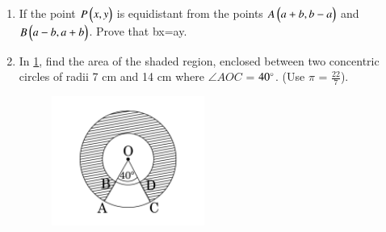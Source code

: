 \documentclass[book,11pt]{IEEEtran}
\renewcommand\thesection{\arabic{section}}
\begin{document}
\begin{enumerate}[label=\thesection.\arabic*.,ref=\thesection.\theenumi]
\item  If the point $P\begin{pmatrix}x, y\end{pmatrix}$ is equidistant from the points $A\begin{pmatrix}a+b, b-a\end{pmatrix}$ and $B\begin{pmatrix}a-b, a+b\end{pmatrix}$. Prove that bx=ay.\\
   
\item  In \ref{figure_6}, find the area of the shaded region, enclosed between two concentric circles of radii 7 cm and 14 cm where $\angle AOC$ = $40\degree$. (Use $\pi$ = $\frac{22}{7}$).
	\begin{figure}[h!]
      \centering
      \includegraphics[width=5cm]{figs/6.png}
      \caption{}
      \label{figure_6}
\end{figure} 


\end{enumerate}
\end{document}
